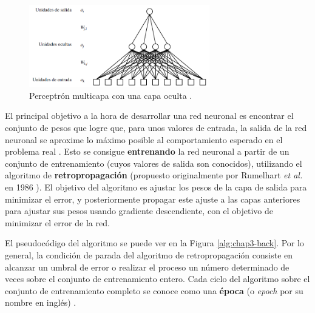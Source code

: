 \begin{figure}[h]
    \centering
    \includegraphics[width=0.7\textwidth]{imagenes/cap3/mlp.png}
    \caption{Perceptrón multicapa con una capa oculta \cite{alma991004256519704990}.}
    \label{fig:chap3-mlp}
\end{figure}

El principal objetivo a la hora de desarrollar una red neuronal es encontrar el conjunto de pesos que logre que, para unos valores de entrada, la salida de la red neuronal se aproxime lo máximo posible al comportamiento esperado en el problema real \cite{Zhang2003ArtificialNN}. Esto se consigue \textbf{entrenando} la red neuronal a partir de un conjunto de entrenamiento (cuyos valores de salida son conocidos), utilizando el algoritmo de \textbf{retropropagación} (propuesto originalmente por Rumelhart \textit{et al.} en 1986 \cite{Rumelhart:1986we}). El objetivo del algoritmo es ajustar los pesos de la capa de salida para minimizar el error, y posteriormente propagar este ajuste a las capas anteriores para ajustar sus pesos usando gradiente descendiente, con el objetivo de minimizar el error de la red. 

El pseudocódigo del algoritmo se puede ver en la Figura \ref{alg:chap3-back}. Por lo general, la condición de parada del algoritmo de retropropagación consiste en alcanzar un umbral de error o realizar el proceso un número determinado de veces sobre el conjunto de entrenamiento entero. Cada ciclo del algoritmo sobre el conjunto de entrenamiento completo se conoce como una \textbf{época} (o \textit{epoch} por su nombre en inglés) \cite{alma991004256519704990}. 

